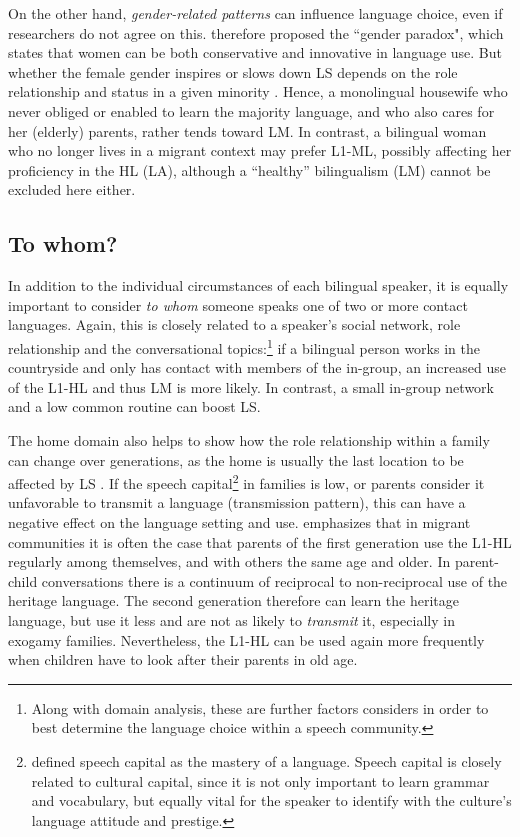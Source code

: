 \documentclass[output=paper]{langscibook}
\begin{document}
On the other hand, \emph{gender-related patterns} can influence language choice, even if researchers do not agree on this. \textcite[213--215]{Labov1990} therefore proposed the ``gender paradox", which states that women can be both conservative and innovative in language use. But whether the female gender inspires or slows down LS depends on the role relationship and status in a given minority \parencite[86--88]{Pauwels2016}. Hence, a monolingual housewife who never obliged or enabled to learn the majority language, and who also cares for her (elderly) parents, rather tends toward LM. In contrast, a bilingual woman who no longer lives in a migrant context may prefer L1-ML, possibly affecting her proficiency in the HL (LA), although a ``healthy'' bilingualism (LM) cannot be excluded here either.


\subsection{To whom?}

In addition to the individual circumstances of each bilingual speaker, it is equally important to consider \emph{to whom} someone speaks one of two or more contact languages. Again, this is closely related to a speaker's social network, role relationship and the conversational topics:\footnote{Along with domain analysis, these are further factors \textcite{Fishman1964} considers in order to best determine the language choice within a speech community.} if a bilingual person works in the countryside and only has contact with members of the in-group, an increased use of the L1-HL and thus LM is more likely. In contrast, a small in-group network and a low common routine can boost LS. 

The home domain also helps to show how the role relationship within a family can change over generations, as the home is usually the last location to be affected by LS \parencite[616]{Heinrich2015}. If the speech capital\footnote{\textcite[18]{Bourdieu1977} defined speech capital as the mastery of a language. Speech capital is closely related to cultural capital, since it is not only important to learn grammar and vocabulary, but equally vital for the speaker to identify with the culture’s language attitude and prestige.} in families is low, or parents consider it unfavorable to transmit a language (transmission pattern), this can have a negative effect on the language setting and use. \textcite[84--89]{Pauwels2016} emphasizes that in migrant communities it is often the case that parents of the first generation use the L1-HL regularly among themselves, and with others the same age and older. In parent-child conversations there is a continuum of reciprocal to non-reciprocal use of the heritage language. The second generation therefore can learn the heritage language, but use it less and are not as likely to \emph{transmit} it, especially in exogamy families. Nevertheless, the L1-HL can be used again more frequently when children have to look after their parents in old age.
\end{document}

